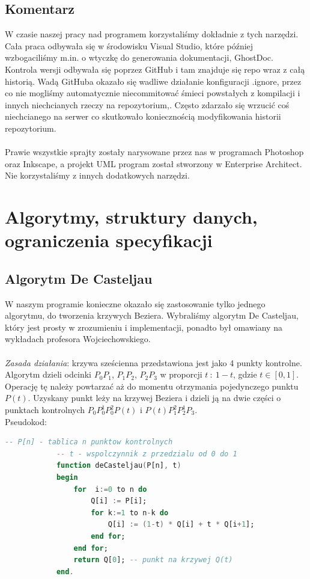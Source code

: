 	\subsection{{\Large Komentarz}}
		\indent \indent W czasie naszej pracy nad programem korzystaliśmy dokładnie z tych narzędzi. Cała praca odbywała się w środowisku Visual Studio, które później wzbogaciliśmy m.in. o wtyczkę do generowania dokumentacji, GhostDoc. Kontrola wersji odbywała się poprzez GitHub i tam znajduje się repo wraz z całą historią. Wadą GitHuba okazało się wadliwe działanie konfiguracji .ignore, przez co nie mogliśmy automatycznie niecommitować śmieci powstałych z kompilacji i innych niechcianych rzeczy na repozytorium,. Często zdarzało się wrzucić coś niechcianego na serwer co skutkowało koniecznością modyfikowania historii repozytorium.\\\\
		\indent Prawie wszystkie sprajty zostały narysowane przez nas w programach Photoshop oraz Inkscape, a projekt UML program został stworzony w Enterprise Architect. Nie korzystaliśmy z innych dodatkowych narzędzi.
\newpage
\section{Algorytmy, struktury danych, ograniczenia specyfikacji}
	\subsection{Algorytm De Casteljau}
		\indent \indent W naszym programie konieczne okazało się zastosowanie tylko jednego algorytmu, do tworzenia krzywych Beziera. Wybraliśmy algorytm De Casteljau, który jest prosty w zrozumieniu i implementacji, ponadto był omawiany na wykładach profesora Wojciechowskiego.\\\\
		\indent \emph{Zasada działania}: krzywa sześcienna przedstawiona jest jako 4 punkty kontrolne. Algorytm dzieli odcinki $ P_0 P_1 $, $ P_1 P_2 $, $ P_2 P_3 $ w proporcji $ t\: : \: 1-t $, gdzie $ t \in [0, 1] $. Operację tę należy powtarzać aż do momentu otrzymania pojedynczego punktu $ P(t) $. Uzyskany punkt leży na krzywej Beziera i dzieli ją na dwie części o punktach kontrolnych $ P_0 P_0^1 P_0^2 P(t) $ i $ P(t) P_1^2 P_2^1 P_3 $.
		\\
		Pseudokod:
		\begin{lstlisting}[language=Ada, frame=single, autogobble=true, commentstyle=\ttfamily\itshape\color{gray}, frameround=ffff,rulecolor=\color{black}, tabsize=4]
			-- P[n] - tablica n punktow kontrolnych
			-- t - wspolczynnik z przedzialu od 0 do 1
			function deCasteljau(P[n], t)
			begin
				for  i:=0 to n do
					Q[i] := P[i];
					for k:=1 to n-k do
						Q[i] := (1-t) * Q[i] + t * Q[i+1];
					end for;
				end for;
				return Q[0]; -- punkt na krzywej Q(t)
			end.
		\end{lstlisting}
